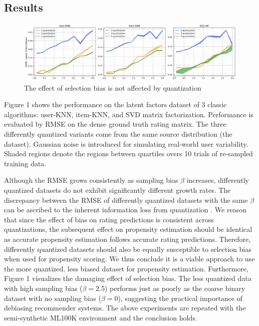 \documentclass{article}
\begin{document}
\subsection{Results}
\begin{figure}
  \centering
  \includegraphics[width=\textwidth]{1.png}
  \caption{The effect of selection bias is not affected by quantization}
\end{figure}
Figure 1 shows the performance on the latent factors dataset of 3 classic algorithms: user-KNN, item-KNN, and SVD matrix factorization. Performance is evaluated by RMSE on the dense ground truth rating matrix. The three differently quantized variants come from the same source distribution (the dataset). Gaussian noise is introduced for simulating real-world user variability. Shaded regions denote the regions between quartiles overs 10 trials of re-sampled training data. 

Although the RMSE grows consistently as sampling bias $\beta$ increases, differently quantized datasets do not exhibit significantly different growth rates. The discrepancy between the RMSE of differently quantized datasets with the same $\beta$ can be ascribed to the inherent information loss from quantization \cite{widrow1996statistical}. We reason that since the effect of bias on rating predictions is consistent across quantizations, the subsequent effect on propensity estimation should be identical as accurate propensity estimation follows accurate rating predictions. Therefore, differently quantized datasets should also be equally susceptible to selection bias when used for propensity scoring. We thus conclude it is a viable approach to use the more quantized, less biased dataset for propensity estimation. Furthermore, Figure 1 visualizes the damaging effect of selection bias. 
The less quantized data with high sampling bias ($\beta=2.5$) performs just as poorly as the coarse binary dataset with no sampling bias ($\beta=0$),
suggesting the practical importance of debiasing recommender systems. 
The above experiments are repeated with the semi-synthetic ML100K environment and the conclusion holds.
\end{document}
